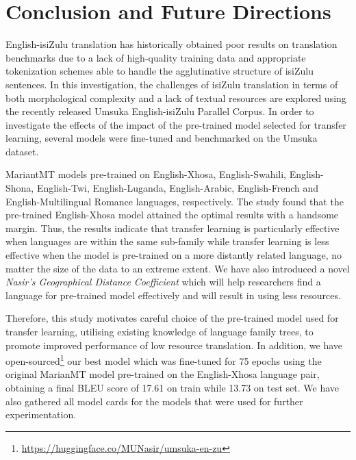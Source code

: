 \documentclass[11pt]{article}
\begin{document}
\section{Conclusion and Future Directions}

English-isiZulu translation has historically obtained poor results on translation benchmarks due to a lack of high-quality training data and appropriate tokenization schemes able to handle the agglutinative structure of isiZulu sentences. In this investigation, the challenges of isiZulu translation in terms of both morphological complexity and a lack of textual resources are explored using the recently released Umsuka English-isiZulu Parallel Corpus. In order to investigate the effects of  the impact of the pre-trained model selected for transfer learning, several models were fine-tuned and benchmarked on the Umsuka dataset.


MariantMT models pre-trained on English-Xhosa, English-Swahili, English-Shona, English-Twi, English-Luganda, English-Arabic, English-French and English-Multilingual Romance languages, respectively. The study found that the pre-trained English-Xhosa model attained the optimal results with a handsome margin. Thus, the results indicate that transfer learning is particularly effective when languages are within the same sub-family while transfer learning is less effective when the model is pre-trained on a more distantly related language, no matter the size of the data to an extreme extent. We have also introduced a novel \emph{Nasir's Geographical Distance Coefficient} which will help researchers find a language for pre-trained model effectively and will result in using less resources.

Therefore, this study motivates careful choice of the pre-trained model used for transfer learning, utilising existing knowledge of language family trees, to promote improved performance of low resource translation. In addition, we have open-sourced\footnote{\url{https://huggingface.co/MUNasir/umsuka-en-zu}} our best model which was fine-tuned for 75 epochs using the original MarianMT model pre-trained on the English-Xhosa language pair, obtaining a final BLEU score of 17.61 on train while 13.73 on test set. We have also gathered all model cards for the models that were used for further experimentation.
\end{document}
